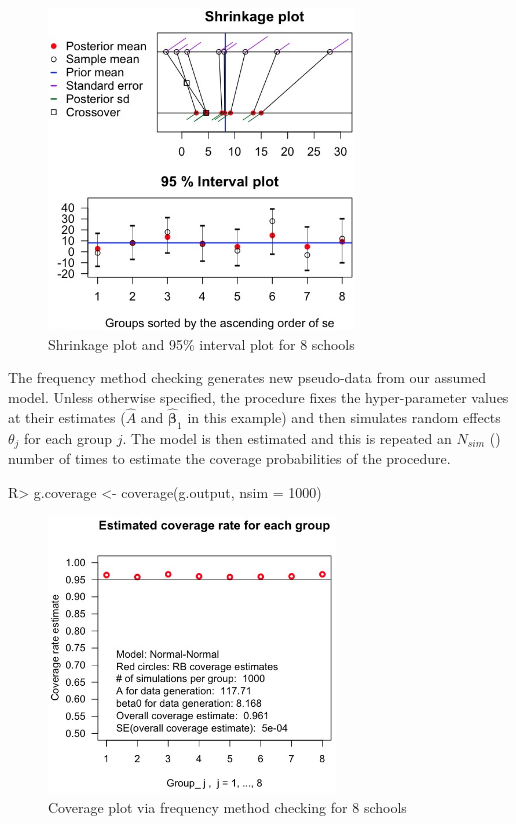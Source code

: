 \documentclass[article]{jss}
\begin{document}
\begin{figure}[h] 
\begin{center}
\includegraphics[width = 3.2in]{school1.png}
\caption{Shrinkage plot and 95\% interval plot for 8 schools}
\label{fig:8schoolsplot}
\end{center}
\end{figure}


The frequency method checking generates new pseudo-data from our assumed model. Unless otherwise specified, the procedure fixes the hyper-parameter values at their estimates ($\hat{A}$ and $\hat{\boldsymbol{\beta}}_1$ in this example) and then simulates random effects $\theta_j$ for each group $j$. The model is then estimated and this is repeated an $N_{sim}$ () number of times to estimate the coverage probabilities of the procedure.  

\begin{CodeChunk}
\begin{CodeInput}
R> g.coverage <- coverage(g.output, nsim = 1000)
\end{CodeInput}
\end{CodeChunk}
\begin{figure}[h] 
\begin{center}
\includegraphics[width = 3in]{school2.png}
\caption{Coverage plot via frequency method checking for 8 schools}
\label{fig:schoolcoverage}
\end{center}
\end{figure}
\end{document}
